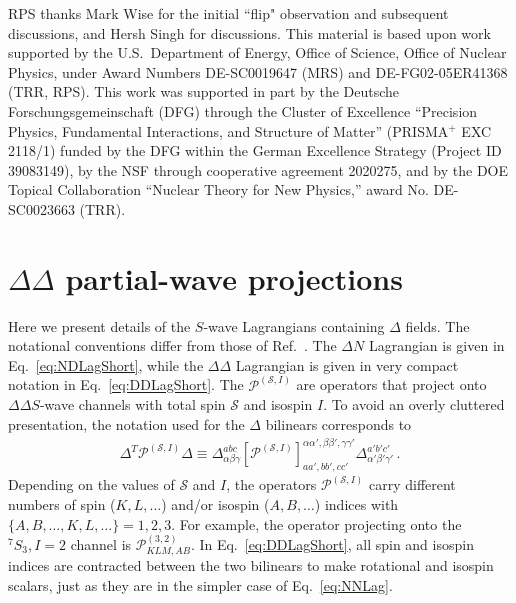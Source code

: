\documentclass[nofootinbib, preprint, aps, prc, superscriptaddress,11pt]{revtex4-1}
\newcommand{\sevenS}{\ensuremath{{{}^{7}\!S_3}}\xspace}
\newcommand\Swave{$S$-wave\xspace}
\newcommand{\1}{\mathbbm{1}}
\newcommand{\D}{\ensuremath{\Delta}\xspace}
\newcommand{\DD}{\ensuremath{\Delta\Delta}\xspace}
\begin{document}
\begin{acknowledgments}

RPS thanks Mark Wise for the initial ``flip" observation and subsequent discussions, and Hersh Singh for discussions.
This material is based upon work supported by the U.S.~Department of Energy, Office of Science, Office of Nuclear Physics,
under Award Numbers DE-SC0019647 (MRS) and DE-FG02-05ER41368 (TRR, RPS).
This work was supported in part by the Deutsche Forschungsgemeinschaft (DFG) through the Cluster of Excellence ``Precision Physics, Fundamental Interactions, and Structure of Matter'' (PRISMA${}^+$ EXC 2118/1) funded by the DFG within the German Excellence Strategy (Project ID 39083149), by the NSF through cooperative agreement 2020275, and by the DOE Topical Collaboration “Nuclear Theory for New Physics,” award No. DE-SC0023663 (TRR).

\end{acknowledgments}




\appendix
\section{\DD partial-wave projections}
\label{sec:AppLagrangians}

Here we present details of the \Swave Lagrangians containing \D fields. The notational conventions differ from those of Ref.~\cite{Savage:1996tb}. 
The $\D N$ Lagrangian is given in Eq.~\eqref{eq:NDLagShort}, while the \DD Lagrangian is given in very compact notation in Eq.~\eqref{eq:DDLagShort}.
The $\mathscr{P}^{(\mathscr{S},I)}$ are operators that project onto \DD $S$-wave channels with total spin $\mathscr{S}$ and isospin $I$. 
To avoid an overly cluttered presentation, the notation used for the \D bilinears corresponds to
\begin{align} \label{eq:DDProjectorShorthand}
    \D^T \mathscr{P}^{(\mathscr{S},I)} \D \equiv \D_{\alpha\beta\gamma}^{abc}    \left[\mathscr{P}^{(\mathscr{S},I)}\right]^{\alpha\alpha',\beta\beta',\gamma\gamma'}_{aa',bb',cc'}
    \D_{\alpha'\beta'\gamma'}^{a'b'c'} \, .
\end{align}
Depending on the values of $\mathscr{S}$ and $I$, the operators $\mathscr{P}^{(\mathscr{S},I)}$ carry different numbers of spin ($K,L,\ldots$) and/or isospin ($A,B,\ldots$) indices with $\{A,B,\ldots,K,L,\ldots\} = 1,2,3$. 
For example, the operator projecting onto the $\sevenS, I=2$ channel is $\mathscr{P}^{(3,2)}_{KLM,AB}$.
In Eq.~\eqref{eq:DDLagShort}, all spin and isospin indices are contracted between the two bilinears to make rotational and isospin scalars, just as they are in the simpler case of Eq.~\eqref{eq:NNLag}.
\end{document}
